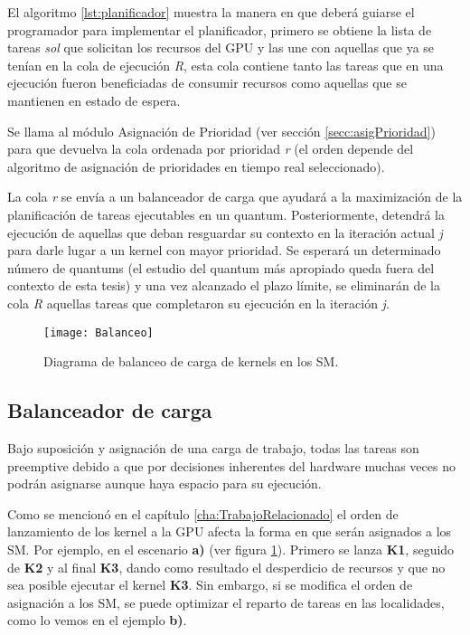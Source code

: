 El algoritmo \ref{lst:planificador} muestra la manera en que deberá guiarse el programador para implementar el planificador, primero se obtiene la lista de tareas \textit{sol} que solicitan los recursos del GPU y las une con aquellas que ya se tenían en la cola de ejecución \textit{R}, esta cola contiene tanto las tareas que en una ejecución fueron beneficiadas de consumir recursos como aquellas que se mantienen en estado de espera.
\newline

Se llama al módulo Asignación de Prioridad (ver sección \ref{secc:asigPrioridad}) para que devuelva la cola ordenada por prioridad \textit{r} (el orden depende del algoritmo de asignación de prioridades en tiempo real seleccionado).
\newline



La cola \textit{r} se envía a un balanceador de carga que ayudará a la maximización de la planificación de tareas ejecutables en un quantum. Posteriormente, detendrá la ejecución de aquellas que deban resguardar su contexto en la iteración actual \textit{j} para darle lugar a un kernel con mayor prioridad.
Se esperará un determinado número de quantums (el estudio del quantum más apropiado queda fuera del contexto de esta tesis) y una vez alcanzado el plazo límite, se eliminarán de la cola \textit{R} aquellas tareas que completaron su ejecución en la iteración \textit{j}. 


    \begin{figure}[!]
      \centering
        \texttt{[image: Balanceo]}
        \caption{Diagrama de balanceo de carga de kernels en los SM.}
        \label{fig:Balanceo}
    \end{figure}
    
\subsection{Balanceador de carga} \label{secc:balanceador}

Bajo suposición y asignación de una carga de trabajo, todas las tareas son preemptive debido a que por decisiones inherentes del hardware muchas veces no podrán asignarse aunque haya espacio para su ejecución.

Como se mencionó en el capítulo \ref{cha:TrabajoRelacionado} el orden de lanzamiento de los kernel a la GPU afecta la forma en que serán asignados a los SM. Por ejemplo, en el escenario \textbf{a)} (ver figura \ref{fig:Balanceo}). Primero se lanza \textbf{K1}, seguido de \textbf{K2} y al final \textbf{K3}, dando como resultado el desperdicio de recursos y que no sea posible ejecutar el kernel \textbf{K3}. Sin embargo, si se modifica el orden de asignación a los SM, se puede optimizar el reparto de tareas en las localidades, como lo vemos en el ejemplo \textbf{b)}.

